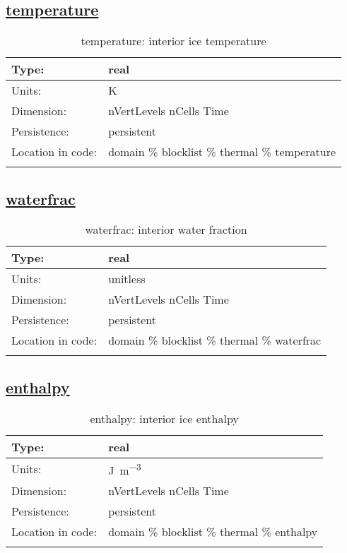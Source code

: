 \subsection[temperature]{\hyperref[sec:var_tab_thermal]{temperature}}
\label{subsec:var_sec_thermal_temperature}
\begin{center}
\begin{longtable}{| p{2.0in} | p{4.0in} |}
        \hline 
        Type: & real \\
        \hline 
        Units: & \si{K} \\
        \hline 
        Dimension: & nVertLevels nCells Time \\
        \hline 
        Persistence: & persistent \\
        \hline 
         Location in code: & domain \% blocklist \% thermal \% temperature \\
         \hline 
    \caption{temperature: interior ice temperature}
\end{longtable}
\end{center}
\subsection[waterfrac]{\hyperref[sec:var_tab_thermal]{waterfrac}}
\label{subsec:var_sec_thermal_waterfrac}
\begin{center}
\begin{longtable}{| p{2.0in} | p{4.0in} |}
        \hline 
        Type: & real \\
        \hline 
        Units: & \si{unitless} \\
        \hline 
        Dimension: & nVertLevels nCells Time \\
        \hline 
        Persistence: & persistent \\
        \hline 
         Location in code: & domain \% blocklist \% thermal \% waterfrac \\
         \hline 
    \caption{waterfrac: interior water fraction}
\end{longtable}
\end{center}
\subsection[enthalpy]{\hyperref[sec:var_tab_thermal]{enthalpy}}
\label{subsec:var_sec_thermal_enthalpy}
\begin{center}
\begin{longtable}{| p{2.0in} | p{4.0in} |}
        \hline 
        Type: & real \\
        \hline 
        Units: & \si{J.m^{-3}} \\
        \hline 
        Dimension: & nVertLevels nCells Time \\
        \hline 
        Persistence: & persistent \\
        \hline 
         Location in code: & domain \% blocklist \% thermal \% enthalpy \\
         \hline 
    \caption{enthalpy: interior ice enthalpy}
\end{longtable}
\end{center}
